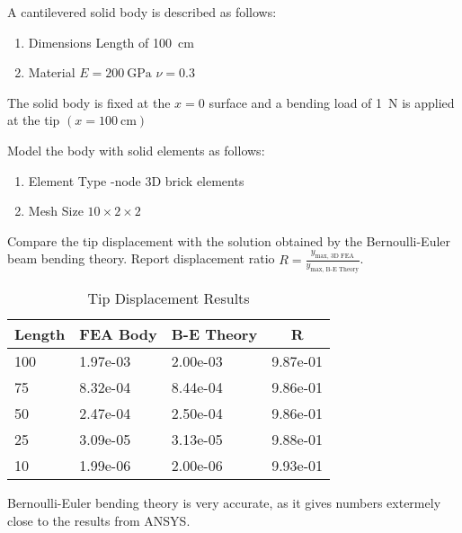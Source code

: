 \begin{homeworkProblem}

	A cantilevered solid body is described as follows:
	\begin{enumerate}
		\item Dimensions
		      \subitem Length of \qty{100}{\cm}
		\item Material
		      \subitem \( E = \qty{200}{\GPa} \)
		      \subitem \( \nu = 0.3 \)
	\end{enumerate}
	The solid body is fixed at the \( x = 0 \) surface and a bending load of \qty{1}{\N} is applied at the tip \( \left( x = \qty{100}{\cm} \right) \)

	Model the body with solid elements as follows:
	\begin{enumerate}
		\item Element Type
		      -node 3D brick elements
		\item Mesh Size
		      \subitem \( 10 \times 2 \times 2 \)
	\end{enumerate}

	Compare the tip displacement with the solution obtained by the Bernoulli-Euler beam bending theory. Report displacement ratio \( R = \frac{y_{\text{max, 3D FEA}}}{y_{\text{max, B-E Theory}}} \).

	\solution

	\begin{table}[h]
		\caption{Tip Displacement Results}\label{tab:FEA}
		\begin{center}
			\begin{tabular}[c]{l|lll}
				\hline
				\multicolumn{1}{c|}{\textbf{Length}}    &
				\multicolumn{1}{c}{\textbf{FEA Body}}   &
				\multicolumn{1}{c}{\textbf{B-E Theory}} &
				\multicolumn{1}{c}{\textbf{R}}                                           \\
				\hline
				100                                     & 1.97e-03 & 2.00e-03 & 9.87e-01 \\
				75                                      & 8.32e-04 & 8.44e-04 & 9.86e-01 \\
				50                                      & 2.47e-04 & 2.50e-04 & 9.86e-01 \\
				25                                      & 3.09e-05 & 3.13e-05 & 9.88e-01 \\
				10                                      & 1.99e-06 & 2.00e-06 & 9.93e-01
			\end{tabular}
		\end{center}
	\end{table}

	Bernoulli-Euler bending theory is very accurate, as it gives numbers extermely close to the results from ANSYS.

\end{homeworkProblem}

